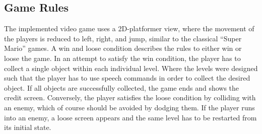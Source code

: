 
\subsection{Game Rules}\label{sec:game_design_rules}
The implemented video game uses a 2D-platformer view, where the movement of the players is reduced to left, right, and jump, similar to the classical \enquote{Super Mario} games.
A win and loose condition describes the rules to either win or loose the game.
In an attempt to satisfy the win condition, the player has to collect a single object within each individual level.
Where the levels were designed such that the player has to use speech commands in order to collect the desired object.
If all objects are successfully collected, the game ends and shows the credit screen.
Conversely, the player satisfies the loose condition by colliding with an enemy, which of course should be avoided by dodging them.
If the player runs into an enemy, a loose screen appears and the same level has to be restarted from its initial state.




